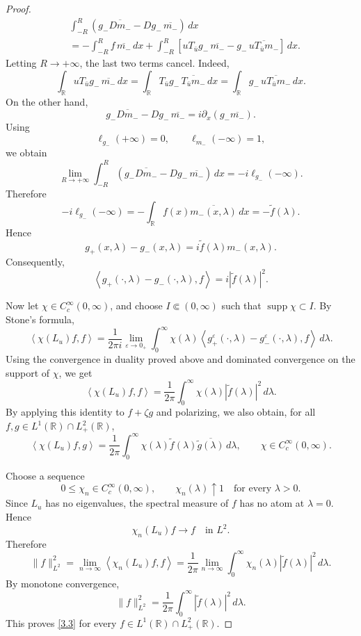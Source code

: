 \documentclass[10pt]{article}
\numberwithin{equation}{section}
\numberwithin{theorem}{section}
\begin{document}
\begin{proof}
\[\begin{aligned}
&\int_{-R}^R
\left(
g_-\overline{Dm_-}
-
Dg_-\,\overline{m_-}
\right)\,dx  \\
&=
-\int_{-R}^R f\,\overline{m_-}\,dx
+
\int_{-R}^R
\left[
uT_{\bar u}g_-\,\overline{m_-}
-
g_-\,\overline{uT_{\bar u}m_-}
\right]\,dx .
\end{aligned}
\]
Letting \(R\to+\infty\), the last two terms cancel. Indeed,
\[
\int_{\mathbb R}
uT_{\bar u}g_-\,\overline{m_-}\,dx
=
\int_{\mathbb R}
T_{\bar u}g_-\,\overline{T_{\bar u}m_-}\,dx
=
\int_{\mathbb R}
g_-\,\overline{uT_{\bar u}m_-}\,dx .
\]
On the other hand,
\[
g_-\overline{Dm_-}-Dg_-\,\overline{m_-}
=
i\partial_x(g_-\overline{m_-}).
\]
Using
\[
\ell_{g_-}(+\infty)=0,
\qquad
\ell_{m_-}(-\infty)=1,
\]
we obtain
\[
\lim_{R\to+\infty}
\int_{-R}^R
\left(
g_-\overline{Dm_-}
-
Dg_-\,\overline{m_-}
\right)\,dx
=
-i\ell_{g_-}(-\infty).
\]
Therefore
\[
-i\ell_{g_-}(-\infty)
=
-\int_{\mathbb R} f(x)\overline{m_-(x,\lambda)}\,dx
=
-\widetilde f(\lambda).
\]
Hence
\[
g_+(x,\lambda)-g_-(x,\lambda)
=
i\widetilde f(\lambda)m_-(x,\lambda).
\]
Consequently,
\[
\left\langle g_+(\cdot,\lambda)-g_-(\cdot,\lambda),f\right\rangle
=
i|\widetilde f(\lambda)|^2 .
\]

Now let \(\chi\in C_c^\infty(0,\infty)\), and choose \(I\Subset(0,\infty)\)
such that \(\operatorname{supp}\chi\subset I\). By Stone's formula,
\[
\left\langle \chi(L_u)f,f\right\rangle
=
\frac{1}{2\pi i}
\lim_{\varepsilon\to0_+}
\int_0^\infty
\chi(\lambda)
\left\langle
g_+^\varepsilon(\cdot,\lambda)
-
g_-^\varepsilon(\cdot,\lambda),
f
\right\rangle
\,d\lambda .
\]
Using the convergence in duality proved above and dominated convergence on the
support of \(\chi\), we get
\[
\left\langle \chi(L_u)f,f\right\rangle
=
\frac{1}{2\pi}
\int_0^\infty
\chi(\lambda)|\widetilde f(\lambda)|^2\,d\lambda .
\]
By applying this identity to \(f+\zeta g\) and polarizing, we also obtain, for
all \(f,g\in L^1(\mathbb R)\cap L^2_+(\mathbb R)\),
\begin{equation}
\label{eq:local_spectral_identity}
\left\langle \chi(L_u)f,g\right\rangle
=
\frac{1}{2\pi}
\int_0^\infty
\chi(\lambda)\widetilde f(\lambda)
\overline{\widetilde g(\lambda)}\,d\lambda ,
\qquad
\chi\in C_c^\infty(0,\infty).
\end{equation}

Choose a sequence
\[
0\leq \chi_n\in C_c^\infty(0,\infty),
\qquad
\chi_n(\lambda)\uparrow 1
\quad\text{for every }\lambda>0.
\]
Since \(L_u\) has no eigenvalues, the spectral measure of \(f\) has no atom at
\(\lambda=0\). Hence
\[
\chi_n(L_u)f\to f
\quad\text{in }L^2.
\]
Therefore
\[
\|f\|_{L^2}^2
=
\lim_{n\to\infty}
\left\langle \chi_n(L_u)f,f\right\rangle
=
\frac{1}{2\pi}
\lim_{n\to\infty}
\int_0^\infty
\chi_n(\lambda)|\widetilde f(\lambda)|^2\,d\lambda .
\]
By monotone convergence,
\[
\|f\|_{L^2}^2
=
\frac{1}{2\pi}
\int_0^\infty
|\widetilde f(\lambda)|^2\,d\lambda .
\]
This proves \eqref{3.3} for every
\(f\in L^1(\mathbb R)\cap L^2_+(\mathbb R)\).


\end{proof}
\end{document}
